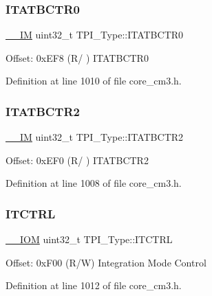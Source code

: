 \subsubsection{\texorpdfstring{I\+T\+A\+T\+B\+C\+T\+R0}{ITATBCTR0}}
{\footnotesize\ttfamily \hyperlink{core__sc300_8h_a4cc1649793116d7c2d8afce7a4ffce43}{\+\_\+\+\_\+\+IM} uint32\+\_\+t T\+P\+I\+\_\+\+Type\+::\+I\+T\+A\+T\+B\+C\+T\+R0}

Offset\+: 0x\+E\+F8 (R/ ) I\+T\+A\+T\+B\+C\+T\+R0 

Definition at line 1010 of file core\+\_\+cm3.\+h.

\mbox{\label{struct_t_p_i___type_ab358319b969d3fed0f89bbe33e9f1652}} 
\subsubsection{\texorpdfstring{I\+T\+A\+T\+B\+C\+T\+R2}{ITATBCTR2}}
{\footnotesize\ttfamily \hyperlink{core__sc300_8h_a4cc1649793116d7c2d8afce7a4ffce43}{\+\_\+\+\_\+\+IM} uint32\+\_\+t T\+P\+I\+\_\+\+Type\+::\+I\+T\+A\+T\+B\+C\+T\+R2}

Offset\+: 0x\+E\+F0 (R/ ) I\+T\+A\+T\+B\+C\+T\+R2 

Definition at line 1008 of file core\+\_\+cm3.\+h.

\mbox{\label{struct_t_p_i___type_aaa4c823c10f115f7517c82ef86a5a68d}} 
\subsubsection{\texorpdfstring{I\+T\+C\+T\+RL}{ITCTRL}}
{\footnotesize\ttfamily \hyperlink{core__sc300_8h_ab6caba5853a60a17e8e04499b52bf691}{\+\_\+\+\_\+\+I\+OM} uint32\+\_\+t T\+P\+I\+\_\+\+Type\+::\+I\+T\+C\+T\+RL}

Offset\+: 0x\+F00 (R/W) Integration Mode Control 

Definition at line 1012 of file core\+\_\+cm3.\+h.

\mbox{\label{struct_t_p_i___type_a409fb08ad6d58c17fcb7f59d65db6f93}} 
